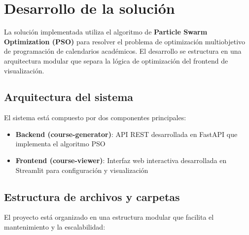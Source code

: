 \section{Desarrollo de la solución}

La solución implementada utiliza el algoritmo de \textbf{Particle Swarm Optimization (PSO)} para resolver el problema de optimización multiobjetivo de programación de calendarios académicos. El desarrollo se estructura en una arquitectura modular que separa la lógica de optimización del frontend de visualización.

\subsection{Arquitectura del sistema}

El sistema está compuesto por dos componentes principales:

\begin{itemize}
    \item \textbf{Backend (course-generator)}: API REST desarrollada en FastAPI que implementa el algoritmo PSO
    \item \textbf{Frontend (course-viewer)}: Interfaz web interactiva desarrollada en Streamlit para configuración y visualización
\end{itemize}

\subsection{Estructura de archivos y carpetas}

El proyecto está organizado en una estructura modular que facilita el mantenimiento y la escalabilidad:

